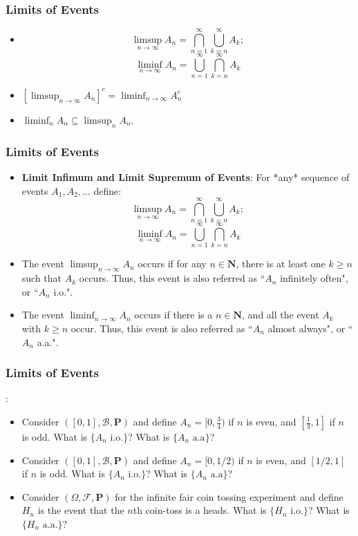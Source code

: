 \documentclass[handout]{beamer}
\newcommand{\BP}{\mathbf{P}}
\begin{document}
\frame
{
  \frametitle{Limits of Events}

   \begin{itemize}


    \item<1->  
$$\limsup_{n\rightarrow \infty} A_n = \bigcap_{n=1}^{\infty} \bigcup_{k=n}^{\infty} A_k;$$
$$\liminf_{n\rightarrow \infty} A_n=\bigcup_{n=1}^{\infty} \bigcap_{k=n}^{\infty} A_k$$  

\item<2->  $\left[ \limsup_{n\rightarrow \infty} A_n \right]^c = \liminf_{n\rightarrow \infty} A_n^c$

\item<3-> $ \liminf_n A_n \subseteq \limsup_n A_n$.


                 \end{itemize}
}

\frame
{
  \frametitle{Limits of Events}

   \begin{itemize}


    \item<1->  
      \textbf{Limit Infimum and Limit Supremum of Events}: For *any* sequence of events $A_1, A_2,\ldots$ define:
$$\limsup_{n\rightarrow \infty} A_n=\bigcap_{n=1}^{\infty} \bigcup_{k=n}^{\infty} A_k;$$
$$\liminf_{n\rightarrow \infty} A_n=\bigcup_{n=1}^{\infty} \bigcap_{k=n}^{\infty} A_k$$  

\item<2->  The event $\limsup_{n\rightarrow \infty} A_n$ occurs if for any $n\in \mathbf{N}$, there is at least one $k \geq n$ such that $A_k$ occurs. Thus, this event is also referred as ``$A_n$ infinitely often", or ``$A_n$ i.o.". 

\item<3->  The event $\liminf_{n\rightarrow \infty} A_n$ occurs if there is a $n\in \mathbf{N}$, and all the event $A_k$ with $k\geq n$ occur. Thus, this event is also referred as ``$A_n$ almost always", or ``$A_n$ a.a.".
               

                 \end{itemize}
}

\frame
{
  \frametitle{Limits of Events}
:

   \begin{itemize}
  
      \item<1->  Consider $([0,1],\mathcal{B},\BP)$ and define $A_n = [0,\frac{3}{4})$ if $n$ is even, and $[\frac{1}{3},1]$ if $n$ is odd. What is $\{A_n \text{ i.o.}\}$? What is $\{A_n \text{ a.a}\}$?
      
    \item<2->  Consider $([0,1],\mathcal{B},\BP)$ and define $A_n = [0,1/2)$ if $n$ is even, and $[1/2,1]$ if $n$ is odd. What is $\{A_n \text{ i.o.}\}$? What is $\{A_n \text{ a.a}\}$?

    \item<3->  Consider $(\Omega, \mathcal{F}, \BP)$ for the infinite fair coin tossing experiment and define $H_n$ is the event that the $n$th coin-toss is a heads. What is $\{H_n \text{ i.o.}\}$? What is $\{H_n \text{ a.a.}\}$?

  \end{itemize}
}
\end{document}
